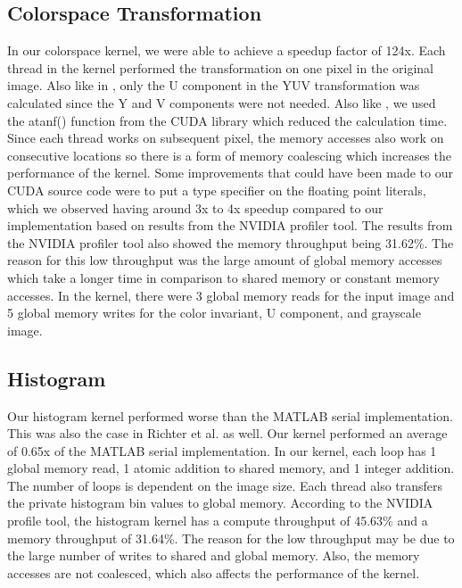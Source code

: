 \documentclass[conference]{IEEEtran}
\begin{document}
      \subsection{Colorspace Transformation}
         In our colorspace kernel, we were able to achieve a speedup factor of 124x. Each thread in the kernel performed the transformation on one pixel in the original image. Also like in \cite{Akoglu}, only the U component in the YUV transformation was calculated since the Y and V components were not needed. Also like \cite{Akoglu}, we used the atanf() function from the CUDA library which reduced the calculation time. Since each thread works on subsequent pixel, the memory accesses also work on consecutive locations so there is a form of memory coalescing which increases the performance of the kernel. Some improvements that could have been made to our CUDA source code were to put a type specifier on the floating point literals, which we observed having around 3x to 4x speedup compared to our implementation based on results from the NVIDIA profiler tool. The results from the NVIDIA profiler tool also showed the memory throughput being 31.62\%. The reason for this low throughput was the large amount of global memory accesses which take a longer time in comparison to shared memory or constant memory accesses. In the kernel, there were 3 global memory reads for the input image and 5 global memory writes for the color invariant, U component, and grayscale image.
      \subsection{Histogram}
         Our histogram kernel performed worse than the MATLAB serial implementation. This was also the case in Richter et al. \cite{Akoglu} as well. Our kernel performed an average of 0.65x of the MATLAB serial implementation. In our kernel, each loop has 1 global memory read, 1 atomic addition to shared memory, and 1 integer addition. The number of loops is dependent on the image size. Each thread also transfers the private histogram bin values to global memory. According to the NVIDIA profile tool, the histogram kernel has a compute throughput of 45.63\% and a memory throughput of 31.64\%. The reason for the low throughput may be due to the large number of writes to shared and global memory. Also, the memory accesses are not coalesced, which also affects the performance of the kernel.
\end{document}
